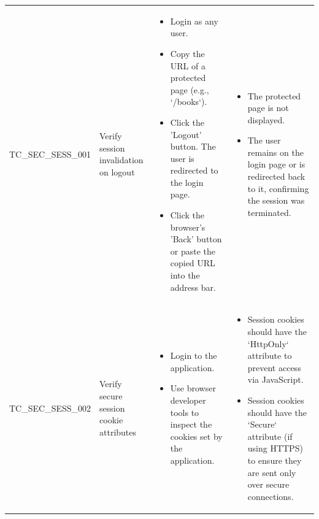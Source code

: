 \begin{longtable}{|>{\scriptsize\raggedright\arraybackslash}p{3cm}|>{\raggedright\arraybackslash}p{3cm}|>{\scriptsize\raggedright\arraybackslash}p{4cm}|>{\scriptsize\raggedright\arraybackslash}p{5cm}|}
\multicolumn{4}{|l|}{\textbf{Sub-Section: Session Management}} \\ \hline
TC\_SEC\_SESS\_001 & Verify session invalidation on logout  & 
    \begin{itemize}[leftmargin=*]
        \item Login as any user.
        \item Copy the URL of a protected page (e.g., `/books`).
        \item Click the 'Logout' button. The user is redirected to the login page.
        \item Click the browser's 'Back' button or paste the copied URL into the address bar.
    \end{itemize} & 
    \begin{itemize}[leftmargin=*]
        \item The protected page is not displayed.
        \item The user remains on the login page or is redirected back to it, confirming the session was terminated.
    \end{itemize} \\ \hline
TC\_SEC\_SESS\_002 & Verify secure session cookie attributes & 
    \begin{itemize}[leftmargin=*]
        \item Login to the application.
        \item Use browser developer tools to inspect the cookies set by the application.
    \end{itemize} & 
    \begin{itemize}[leftmargin=*]
        \item Session cookies should have the `HttpOnly` attribute to prevent access via JavaScript.
        \item Session cookies should have the `Secure` attribute (if using HTTPS) to ensure they are sent only over secure connections.
    \end{itemize} \\ \hline


\end{longtable}
